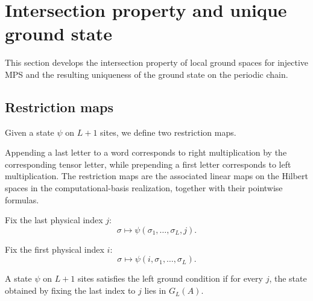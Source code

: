 \section{Intersection property and unique ground state}\label{sec:intersection_unique}

This section develops the intersection property of local ground spaces for
injective MPS and the resulting uniqueness of the ground state on the periodic
chain.

\subsection{Restriction maps}

Given a state $\psi$ on $L+1$ sites, we define two restriction maps.

\begin{remark}
    \leanok
    Appending a last letter to a word corresponds to right multiplication by the
    corresponding tensor letter, while prepending a first letter corresponds to left
    multiplication. The restriction maps are the associated linear maps on the
    Hilbert spaces in the computational-basis realization, together with their
    pointwise formulas.
\end{remark}

\begin{definition}\label{def:restrict_last}
    \leanok
    Fix the last physical index $j$:
    \[
        \sigma \longmapsto \psi(\sigma_1,\ldots,\sigma_L,j).
    \]
\end{definition}

\begin{definition}\label{def:restrict_first}
    \leanok
    Fix the first physical index $i$:
    \[
        \sigma \longmapsto \psi(i,\sigma_1,\ldots,\sigma_L).
    \]
\end{definition}

\begin{definition}\label{def:in_left_ground}
    \leanok
    A state $\psi$ on $L+1$ sites satisfies the left ground condition if
    for every $j$, the state obtained by fixing the last index to $j$ lies in
    $G_L(A)$.
\end{definition}

